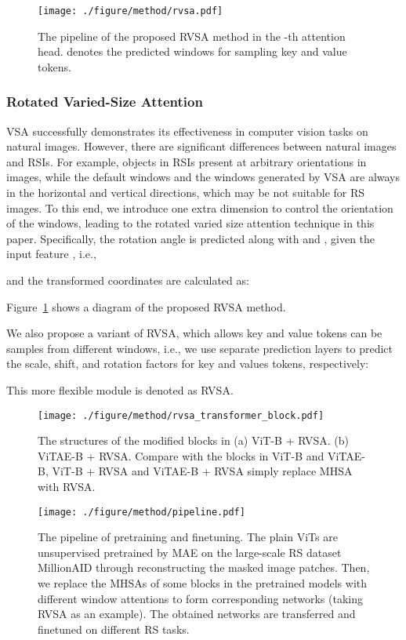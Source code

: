 \documentclass[10pt, journal,twoside]{IEEEtran}
\begin{document}
\begin{figure}[t]
  \centering
  \texttt{[image: ./figure/method/rvsa.pdf]}\\
  \caption{The pipeline of the proposed RVSA method in the -th attention head.  denotes the predicted windows for sampling key and value tokens.
  }
  \label{rvsa}
\end{figure}

\subsubsection{Rotated Varied-Size Attention} 
VSA successfully demonstrates its effectiveness in computer vision tasks on natural images. However, there are significant differences between natural images and RSIs. For example, objects in RSIs present at arbitrary orientations in images, while the default windows and the windows generated by VSA are always in the horizontal and vertical directions, which may be not suitable for RS images. To this end, we introduce one extra dimension to control the orientation of the windows, leading to the rotated varied size attention technique in this paper. Specifically, the rotation angle  is predicted along with  and , given the input feature , i.e.,

and the transformed coordinates are calculated as:

Figure~\ref{rvsa} shows a diagram of the proposed RVSA method.

We also propose a variant of RVSA, which allows key and value tokens can be samples from different windows, i.e., we use separate prediction layers to predict the scale, shift, and rotation factors for key and values tokens, respectively:

This more flexible module is denoted as RVSA. 

\begin{figure}[t]
  \centering
  \texttt{[image: ./figure/method/rvsa\_transformer\_block.pdf]}\\
  \caption{The structures of the modified blocks in (a) ViT-B + RVSA. (b) ViTAE-B + RVSA. Compare with the blocks in ViT-B and ViTAE-B, ViT-B + RVSA and ViTAE-B + RVSA simply replace MHSA with RVSA.
  }
  \label{rvsa_transformer_block}
\end{figure}

\begin{figure*}[t]
  \centering
  \texttt{[image: ./figure/method/pipeline.pdf]}\\
  \caption{The pipeline of pretraining and finetuning. The plain ViTs are unsupervised pretrained by MAE on the large-scale RS dataset MillionAID through reconstructing the masked image patches. Then, we replace the MHSAs of some blocks in the pretrained models with different window attentions to form corresponding networks (taking RVSA as an example). The obtained networks are transferred and finetuned on different RS tasks.
  }
  \label{pipeline}
\end{figure*}
\end{document}
